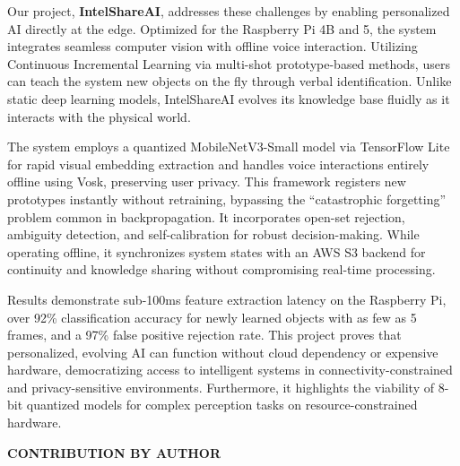 \documentclass[12pt,a4paper]{report}
\begin{document}
Our project, \textbf{IntelShareAI}, addresses these challenges by enabling personalized AI directly at the edge. Optimized for the Raspberry Pi 4B and 5, the system integrates seamless computer vision with offline voice interaction. Utilizing Continuous Incremental Learning via multi-shot prototype-based methods, users can teach the system new objects on the fly through verbal identification. Unlike static deep learning models, IntelShareAI evolves its knowledge base fluidly as it interacts with the physical world.

The system employs a quantized MobileNetV3-Small model via TensorFlow Lite for rapid visual embedding extraction and handles voice interactions entirely offline using Vosk, preserving user privacy. This framework registers new prototypes instantly without retraining, bypassing the ``catastrophic forgetting'' problem common in backpropagation. It incorporates open-set rejection, ambiguity detection, and self-calibration for robust decision-making. While operating offline, it synchronizes system states with an AWS S3 backend for continuity and knowledge sharing without compromising real-time processing.

Results demonstrate sub-100ms feature extraction latency on the Raspberry Pi, over 92\% classification accuracy for newly learned objects with as few as 5 frames, and a 97\% false positive rejection rate. This project proves that personalized, evolving AI can function without cloud dependency or expensive hardware, democratizing access to intelligent systems in connectivity-constrained and privacy-sensitive environments. Furthermore, it highlights the viability of 8-bit quantized models for complex perception tasks on resource-constrained hardware.


\newpage
\begin{center}
    \textbf{\large CONTRIBUTION BY AUTHOR}
\end{center}
\vspace{0.5cm}
\end{document}
